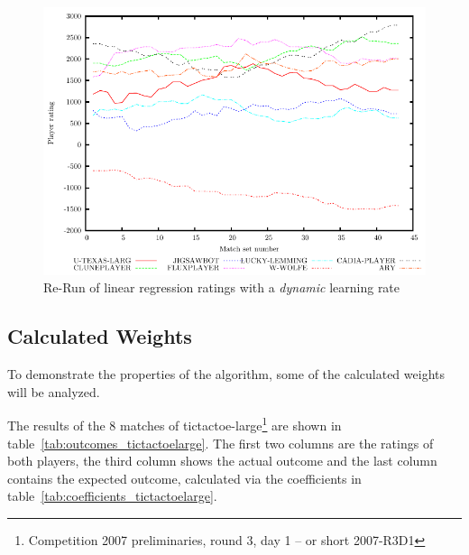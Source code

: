 \documentclass[a4paper,10pt]{article}
\begin{document}
\begin{figure}
 \centering
 \includegraphics[width=\textwidth]{dynamic_linear_regression_60_with_initial_values}
 \caption{Re-Run of linear regression ratings with a \textit{dynamic} learning rate}
 \label{fig:dynamic_linear_regression_with_initial_values}
\end{figure}

\subsection{Calculated Weights}
To demonstrate the properties of the algorithm, some of the calculated weights will be analyzed.

The results of the 8 matches of tictactoe-large\footnote{Competition 2007 preliminaries, round 3, day 1 -- or short 2007-R3D1} are shown in table~\ref{tab:outcomes_tictactoelarge}. The first two columns are the ratings of both players, the third column shows the actual outcome and the last column contains the expected outcome, calculated via the coefficients in table~\ref{tab:coefficients_tictactoelarge}.
\end{document}
